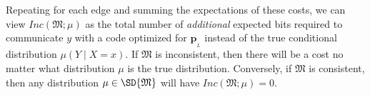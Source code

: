 \documentclass{article}
\theoremstyle{plain}
\theoremstyle{definition}
\theoremstyle{remark}
\newcommand\mat[1]{\mathbf{#1}}
\newcommand{\bp}[1][L]{\mat{p}_{\!_{#1}\!}}
\newcommand{\dg}[1]{\mathfrak{#1}}
\newcommand\inco{\mathit{Inc}}
\numberwithin{equation}{section}
\begin{document}
{		Repeating for each edge and summing the expectations of these costs, we can view
		$\inco(\dg M;\mu)$ as the total number of \emph{additional} expected
        bits required to communicate $y$ with a code optimized for
        $\bp$ instead of the true conditional distribution
                $\mu(Y \mid X=x)$. 
	If $\dg M$ is inconsistent, then there will be a cost no matter
        what distribution $\mu$ is the true distribution.
	Conversely, if $\dg M$ is consistent, then any distribution
        $\mu \in \SD{\dg M}$ will have $\inco(\dg M; \mu) = 0$.  
}	
\end{document}
